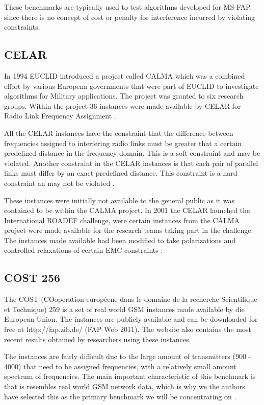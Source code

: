 These benchmarks are typically used to test algorithms developed for MS-FAP, since there is no concept of cost or penalty for interference incurred by violating constraints.
\subsection{CELAR}
In 1994 EUCLID introduced a project called CALMA which was a combined effort by various Europena governments that were part of EUCLID to investigate algorithms for Military applications. The project was granted to six research groups. Within the project 36 instances were made available by CELAR for Radio Link Frequency Assignment \cite{Karen2004,DynamicFAP}.

All the CELAR instances have the constraint that the difference between frequencies assigned to interfering radio links must be greater that a certain predefined distance in the frequency domain. This is a soft constraint and may be violated. Another constraint in the CELAR instances is that each pair of parallel links must differ by an exact predefined distance. This constraint is a hard constraint an may not be violated \cite{DynamicFAP}.

These instances were initially not available to the general public as it was contained to be within the CALMA project. In 2001 the CELAR launched the International ROADEF challenge, were certain instances from the CALMA project were made available for the research teams taking part in the challenge. The instances made available had been modified to take polarizations and controlled relaxations of certain EMC constraints \cite{LowerPolarFAP}.
\subsection{COST 256}
The COST (COoperation européene dans le domaine de la recherche Scientifique et Technique) 259 is a set of real world GSM instances made available by die European Union. The instances are publicly available and can  be downloaded for free at http://fap.zib.de/ (FAP Web 2011). The website also contains the most recent results obtained by researchers using these instances\cite{Karen2004,Eisenblatter}.

The instances are fairly difficult due to the large amount of transmitters (900 - 4000) that need to be assigned frequencies, with a relatively small amount spectrum of frequencies. The main important characteristic of this benchmark is that is resembles real world GSM network data, which is why we the authors have selected this as the primary benchmark we will be concentrating on \cite{Karen2004,FAPWeb}.


